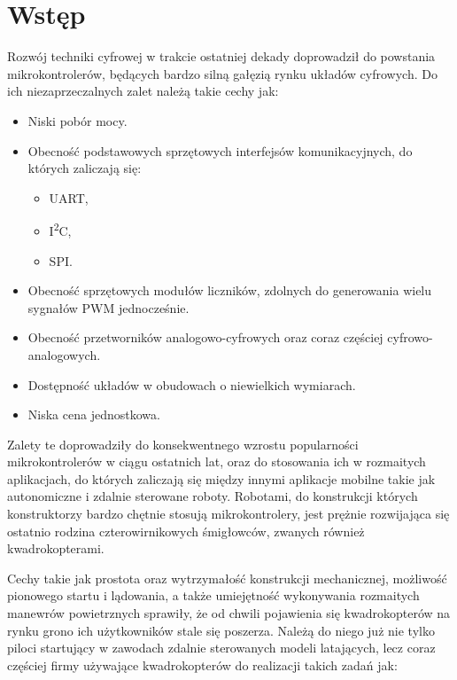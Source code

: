 
\chapter{Wstęp} %
\setcounter{page}{7}
\label{Chapter1} %


Rozwój techniki cyfrowej w trakcie ostatniej dekady doprowadził do powstania mikrokontrolerów, będących bardzo silną gałęzią rynku układów cyfrowych. Do ich niezaprzeczalnych zalet należą takie cechy jak:

\begin{itemize}
	\item Niski pobór mocy.
	\item Obecność podstawowych sprzętowych interfejsów komunikacyjnych, do których zaliczają się:
		\begin{itemize}
			\item UART,
			\item I\textsuperscript{2}C,
			\item SPI.
		\end{itemize}
	\item Obecność sprzętowych modułów liczników, zdolnych do generowania wielu sygnałów PWM jednocześnie.
	\item Obecność przetworników analogowo-cyfrowych oraz coraz częściej cyfrowo-analogowych.
	\item Dostępność układów w obudowach o niewielkich wymiarach.
	\item Niska cena jednostkowa.
\end{itemize}

Zalety te doprowadziły do konsekwentnego wzrostu popularności mikrokontrolerów w ciągu ostatnich lat, oraz do stosowania ich w rozmaitych aplikacjach, do których zaliczają się między innymi aplikacje mobilne takie jak autonomiczne i zdalnie sterowane roboty.
Robotami, do konstrukcji których konstruktorzy bardzo chętnie stosują mikrokontrolery, jest prężnie rozwijająca się ostatnio rodzina czterowirnikowych śmigłowców, zwanych również kwadrokopterami. 

Cechy takie jak prostota oraz wytrzymałość konstrukcji mechanicznej, możliwość pionowego startu i lądowania, a także umiejętność wykonywania rozmaitych manewrów powietrznych sprawiły, że od chwili pojawienia się kwadrokopterów na rynku grono ich użytkowników stale się poszerza.
Należą do niego już nie tylko piloci startujący w zawodach zdalnie sterowanych modeli latających, lecz coraz częściej firmy używające kwadrokopterów do realizacji takich zadań jak:

